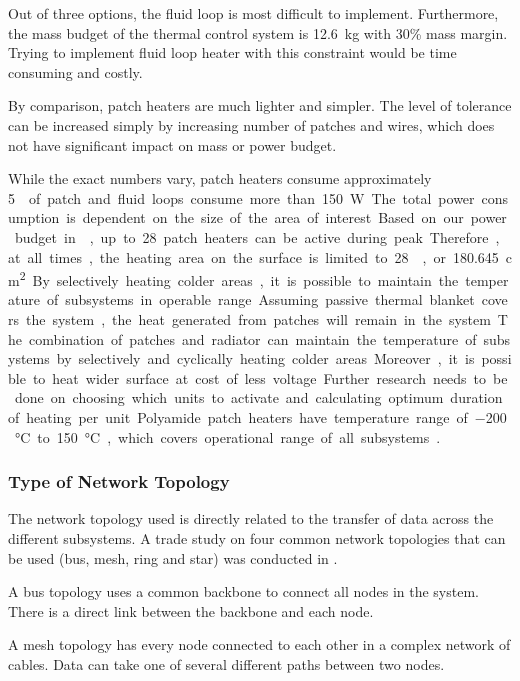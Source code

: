 Out of three options, the fluid loop is most difficult to implement. Furthermore, the mass budget of the thermal control system is \SI{12.6}{\kilo\gram} with 30\% mass margin. Trying to implement fluid loop heater with this constraint would be time consuming and costly.

By comparison, patch heaters are much lighter and simpler. The level of tolerance can be increased simply by increasing number of patches and wires, which does not have significant impact on mass or power budget.

While the exact numbers vary, patch heaters consume approximately \SI{5}{\watt\per{}} of patch and fluid loops consume more than \SI{150}{\watt}. The total power consumption is dependent on the size of the area of interest. 

Based on our power budget in , up to 28 patch heaters can be active during peak. Therefore, at all times, the heating area on the surface is limited to \SI{28}{}, or \SI{180.645}{\square\centi\metre}. By selectively heating colder areas, it is possible to maintain the temperature of subsystems in operable range.  Assuming passive thermal blanket covers the system, the heat generated from patches will remain in the system. The combination of patches and radiator can maintain the temperature of subsystems by selectively and cyclically heating colder areas. Moreover, it is possible to heat wider surface at cost of less voltage. Further research needs to be done on choosing which units to activate and calculating optimum duration of heating per unit. Polyamide patch heaters have temperature range of \SI{-200}{\degreeCelsius} to \SI{150}{\degreeCelsius}, which covers operational range of all subsystems \cite{heater_design}.

\subsubsection{Type of Network Topology}
\label{sect:network_to}
The network topology used is directly related to the transfer of data across the different subsystems. A trade study on four common network topologies that can be used (bus, mesh, ring and star) was conducted in .

A bus topology uses a common backbone to connect all nodes in the system. There is a direct link between the backbone and each node. 

A mesh topology has every node connected to each other in a complex network of cables. Data can take one of several different paths between two nodes.


